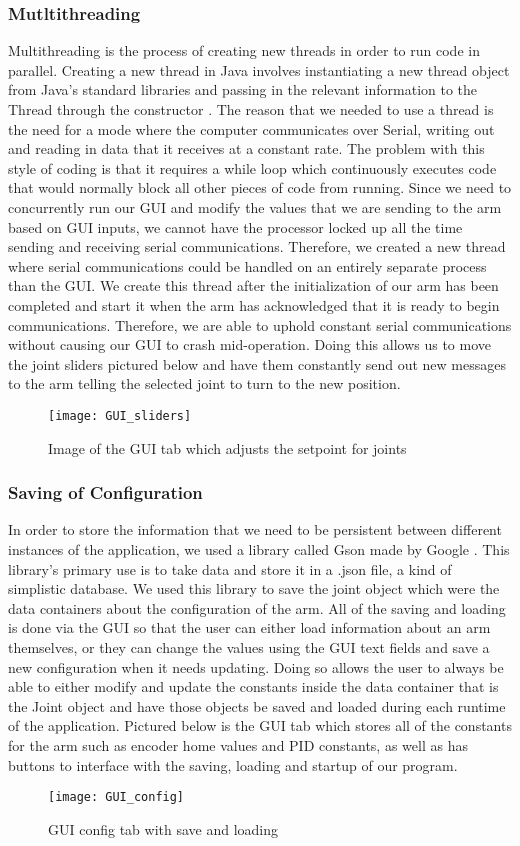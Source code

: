 \subsubsection{Mutltithreading}
Multithreading is the process of creating new threads in order to run code in parallel. Creating a new thread in Java involves instantiating a new thread object from Java's standard libraries and passing in the relevant information to the Thread through the constructor \cite{ThreadJava}. The reason that we needed to use a thread is the need for a mode where the computer communicates over Serial, writing out and reading in data that it receives at a constant rate. The problem with this style of coding is that it requires a while loop which continuously executes code that would normally block all other pieces of code from running. Since we need to concurrently run our GUI and modify the values that we are sending to the arm based on GUI inputs, we cannot have the processor locked up all the time sending and receiving serial communications. Therefore, we created a new thread where serial communications could be handled on an entirely separate process than the GUI. We create this thread after the initialization of our arm has been completed and start it when the arm has acknowledged that it is ready to begin communications. Therefore, we are able to uphold constant serial communications without causing our GUI to crash mid-operation. Doing this allows us to move the joint sliders pictured below and have them constantly send out new messages to the arm telling the selected joint to turn to the new position. 

\begin{figure}[H]
	\centering
	\texttt{[image: GUI\_sliders]}
	\caption{Image of the GUI tab which adjusts the setpoint for joints}
	\label{fig:GUI_Sliders}
\end{figure}


\subsubsection{Saving of Configuration}
In order to store the information that we need to be persistent between different instances of the application, we used a library called Gson made by Google \cite{gson}. This library's primary use is to take data and store it in a .json file, a kind of simplistic database.  We used this library to save the joint object which were the data containers about the configuration of the arm. All of the saving and loading is done via the GUI so that the user can either load information about an arm themselves, or they can change the values using the GUI text fields and save a new configuration when it needs updating. Doing so allows the user to always be able to either modify and update the constants inside the data container that is the Joint object and have those objects be saved and loaded during each runtime of the application. Pictured below is the GUI tab which stores all of the constants for the arm such as encoder home values and PID constants, as well as has buttons to interface with the saving, loading and startup of our program.

\begin{figure}[H]
	\centering
	\texttt{[image: GUI\_config]}
	\caption{GUI config tab with save and loading}
	\label{fig:GUI_config}
\end{figure}






